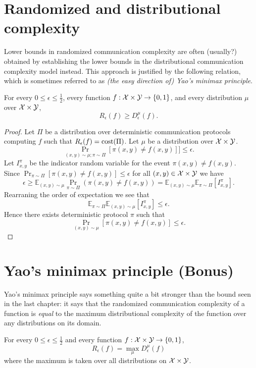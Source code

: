 \newpage 
\section{Randomized and distributional complexity}

Lower bounds in randomized communication complexity are often (usually?) obtained by establishing the lower bounds in the distributional communication complexity model instead. This approach is justified by the following relation, which is sometimes referred to as \emph{(the easy direction of) Yao's minimax principle}.

\begin{theorem}
For every $0 \le \epsilon \le \frac12$, every function $f : \mathcal{X} \times \mathcal{Y} \to \{0,1\}$, and every distribution $\mu$ over $\mathcal{X} \times \mathcal{Y}$,
\[
R_\epsilon(f) \ge D_\epsilon^\mu(f).
\]
\end{theorem}

\begin{proof}
Let $\Pi$ be a distribution over deterministic communication protocols computing $f$ such that $R_\epsilon(f) = \mathrm{cost}(\Pi)$. Let $\mu$ be a distribution over $\mathcal{X}\times\mathcal{Y}$. 
$$\Pr_{(x,y)\sim \mu ;\pi\sim \Pi}[\pi(x,y)\neq f(x,y)]] \leq \epsilon.$$
Let $I^\pi_{x,y}$ be the indicator random variable for the event $\pi(x,y)\neq f(x,y)$. Since $\Pr_{\pi \sim \Pi}[\pi(x,y)\neq f(x,y)]\leq \epsilon$ for all $(x,y) \in \mathcal{X} \times \mathcal{Y}$ we have
$$ \epsilon \geq \mathbb{E}_{ (x,y) \sim \mu} \Pr_{\pi\sim \Pi}(\pi(x,y)\neq f(x,y)) = \mathbb{E}_{ (x,y) \sim \mu} \mathbb{E}_{\pi\sim \Pi}[I^\pi_{x,y}].$$ 
Rearraning the order of expectation we see that
$$ \mathbb{E}_{ \pi\sim \Pi} \mathbb{E}_{(x,y) \sim \mu}[I^\pi_{x,y}] \leq \epsilon.$$
Hence there exists deterministic protocol $\pi$ such that 
$$\Pr_{(x,y)\sim \mu}[\pi(x,y) \neq f(x,y)] \leq \epsilon.$$
\end{proof}


\newpage 
\section{Yao's minimax principle (Bonus)}

Yao's minimax principle says something quite a bit stronger than the bound seen in the last chapter: it says that the randomized communication complexity of a function is \emph{equal} to the maximum distributional complexity of the function over any distributions on its domain.

\begin{theorem}
For every $0 \le \epsilon \le \frac12$ and every function $f : \mathcal{X} \times \mathcal{Y} \to \{0,1\}$, 
\[
R_\epsilon(f) = \max_{\mu} D_\epsilon^\mu(f)
\]
where the maximum is taken over all distributions on $\mathcal{X} \times \mathcal{Y}$.
\end{theorem}

